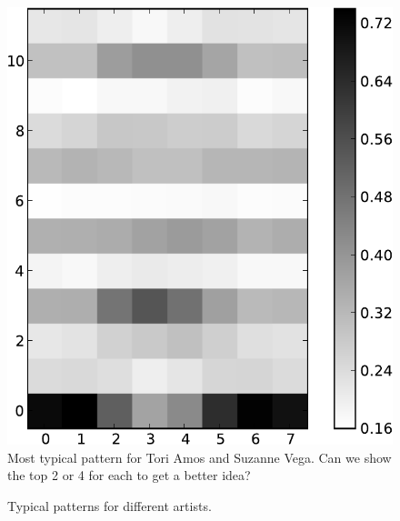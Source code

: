 \documentclass{article}
\begin{document}
\begin{figure}[htb]
\begin{center}
\includegraphics[width=.4\columnwidth]{toriamos_suzannevega_pattern}
\end{center}
\caption{\small{Most typical pattern for Tori Amos and Suzanne Vega.
    Can we show the top 2 or 4 for each to get a better idea?}}
\label{fig:amosvega}
\end{figure}
\fi


\begin{figure}[htb]
  \centering
  \hspace{5mm}                
  \caption{\small{Typical patterns for different artists.}}
  \label{fig:typicalpat}
\end{figure}
\end{document}
